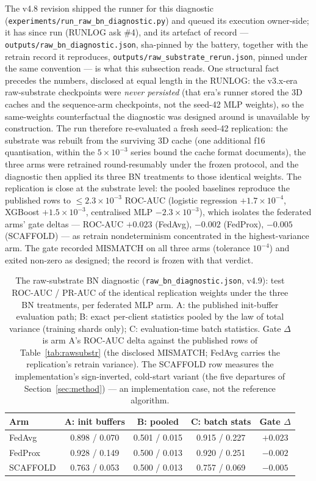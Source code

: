 The v4.8 revision shipped the runner for this diagnostic
(\texttt{experiments/run\_raw\_bn\_diagnostic.py}) and queued its
execution owner-side; it has since run (RUNLOG ask \#4), and its
artefact of record --- \texttt{outputs/raw\_bn\_diagnostic.json},
sha-pinned by the battery, together with the retrain record it
reproduces, \texttt{outputs/raw\_substrate\_rerun.json}, pinned under
the same convention --- is what this subsection reads. One
structural fact precedes the numbers, disclosed at equal length in the
RUNLOG: the v3.x-era raw-substrate checkpoints were \emph{never
persisted} (that era's runner stored the 3D caches and the
sequence-arm checkpoints, not the seed-42 MLP weights), so the
same-weights counterfactual the diagnostic was designed around is
unavailable by construction. The run therefore re-evaluated a fresh
seed-42 replication: the substrate was rebuilt from the surviving 3D
cache (one additional f16 quantisation, within the $5\times10^{-3}$
series bound the cache format documents), the three arms were
retrained round-resumably under the frozen protocol, and the
diagnostic then applied its three BN treatments to those identical
weights. The replication is close at the substrate level: the pooled
baselines reproduce the published rows to $\le 2.3\times10^{-3}$
ROC-AUC (logistic regression $+1.7\times10^{-4}$, XGBoost
$+1.5\times10^{-3}$, centralised MLP $-2.3\times10^{-3}$), which
isolates the federated arms' gate deltas --- ROC-AUC $+0.023$
(FedAvg), $-0.002$ (FedProx), $-0.005$ (SCAFFOLD) --- as retrain
nondeterminism concentrated in the highest-variance arm. The gate
recorded MISMATCH on all three arms (tolerance $10^{-4}$) and exited
non-zero as designed; the record is frozen with that verdict.

\begin{table}[t]
\centering
\caption{The raw-substrate BN diagnostic
(\texttt{raw\_bn\_diagnostic.json}, v4.9): test ROC-AUC / PR-AUC of
the identical replication weights under the three BN treatments, per
federated MLP arm. A: the published init-buffer evaluation path; B:
exact per-client statistics pooled by the law of total variance
(training shards only); C: evaluation-time batch statistics. Gate
$\Delta$ is arm A's ROC-AUC delta against the published rows of
Table~\ref{tab:rawsubstr} (the disclosed MISMATCH; FedAvg carries
the replication's retrain variance). The SCAFFOLD row measures the
implementation's sign-inverted, cold-start variant (the five
departures of Section~\ref{sec:method}) --- an implementation case,
not the reference algorithm.}
\label{tab:rawbndiag}
\small
\begin{tabular}{@{}l c c c c@{}}
\toprule
\textbf{Arm} & \textbf{A: init buffers} & \textbf{B: pooled} &
\textbf{C: batch stats} & \textbf{Gate $\Delta$} \\
\midrule
FedAvg   & 0.898 / 0.070 & 0.501 / 0.015 & 0.915 / 0.227 & $+0.023$ \\
FedProx  & 0.928 / 0.149 & 0.500 / 0.013 & 0.920 / 0.251 & $-0.002$ \\
SCAFFOLD & 0.763 / 0.053 & 0.500 / 0.013 & 0.757 / 0.069 & $-0.005$ \\
\bottomrule
\end{tabular}
\end{table}

